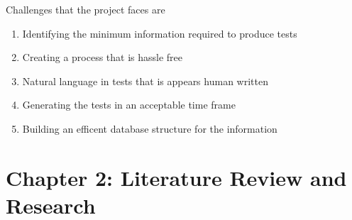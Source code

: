 \documentclass{article}
\begin{document}
\par Challenges that the project faces are
\begin{enumerate}
\item Identifying the minimum information required to produce tests
\item Creating a process that is hassle free
\item Natural language in tests that is appears human written
\item Generating the tests in an acceptable time frame
\item Building an efficent database structure for the information
\end{enumerate}


\section{Chapter 2: Literature Review and Research}
\end{document}
